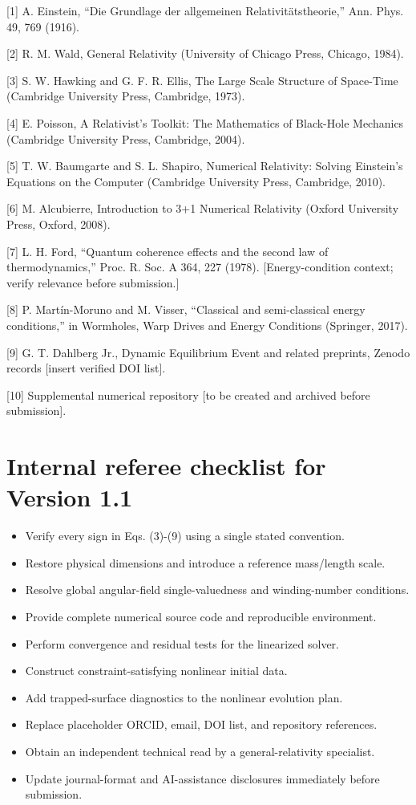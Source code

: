 {[}1{]} A. Einstein, ``Die Grundlage der allgemeinen
Relativitätstheorie,'' Ann. Phys. 49, 769 (1916).

{[}2{]} R. M. Wald, General Relativity (University of Chicago Press,
Chicago, 1984).

{[}3{]} S. W. Hawking and G. F. R. Ellis, The Large Scale Structure of
Space-Time (Cambridge University Press, Cambridge, 1973).

{[}4{]} E. Poisson, A Relativist's Toolkit: The Mathematics of
Black-Hole Mechanics (Cambridge University Press, Cambridge, 2004).

{[}5{]} T. W. Baumgarte and S. L. Shapiro, Numerical Relativity: Solving
Einstein's Equations on the Computer (Cambridge University Press,
Cambridge, 2010).

{[}6{]} M. Alcubierre, Introduction to 3+1 Numerical Relativity (Oxford
University Press, Oxford, 2008).

{[}7{]} L. H. Ford, ``Quantum coherence effects and the second law of
thermodynamics,'' Proc. R. Soc. A 364, 227 (1978). {[}Energy-condition
context; verify relevance before submission.{]}

{[}8{]} P. Martín-Moruno and M. Visser, ``Classical and semi-classical
energy conditions,'' in Wormholes, Warp Drives and Energy Conditions
(Springer, 2017).

{[}9{]} G. T. Dahlberg Jr., Dynamic Equilibrium Event and related
preprints, Zenodo records {[}insert verified DOI list{]}.

{[}10{]} Supplemental numerical repository {[}to be created and archived
before submission{]}.

\section{Internal referee checklist for Version
1.1}\label{internal-referee-checklist-for-version-1.1}

\begin{itemize}
\item[$\square$]
  Verify every sign in Eqs. (3)-(9) using a single stated convention.
\item[$\square$]
  Restore physical dimensions and introduce a reference mass/length
  scale.
\item[$\square$]
  Resolve global angular-field single-valuedness and winding-number
  conditions.
\item[$\square$]
  Provide complete numerical source code and reproducible environment.
\item[$\square$]
  Perform convergence and residual tests for the linearized solver.
\item[$\square$]
  Construct constraint-satisfying nonlinear initial data.
\item[$\square$]
  Add trapped-surface diagnostics to the nonlinear evolution plan.
\item[$\square$]
  Replace placeholder ORCID, email, DOI list, and repository references.
\item[$\square$]
  Obtain an independent technical read by a general-relativity
  specialist.
\item[$\square$]
  Update journal-format and AI-assistance disclosures immediately before
  submission.
\end{itemize}
